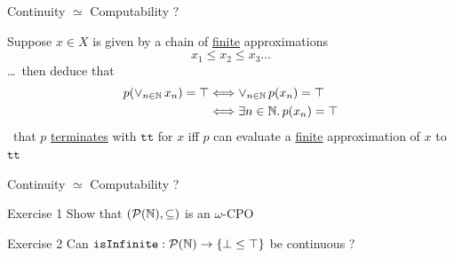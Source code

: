\documentclass{beamer}
\begin{document}
\begin{frame}{Continuity $\simeq$ Computability ?}

        \begin{center}
        \end{center}

        \vfill
        Suppose $x \in X$ is given by a chain of \alert{\underline{finite}} approximations
        \[
                x_1 \leq x_2 \leq x_3 \dots
        \]
        \dots\ then deduce that
        \begin{align*}
                p(\vee_{n \in \mathbb{N}}\, x_n) = \top & \Longleftrightarrow \vee_{n \in \mathbb{N}}\, p(x_n) = \top
                \\
                                                   & \Longleftrightarrow \exists n \in \mathbb{N}.\, p(x_n) = \top
        \end{align*}
        \pause
        \ie\ that $p$ \alert{\underline{terminates}} with $\mathtt{tt}$ for $x$
        iff $p$ can evaluate a \alert{\underline{finite}} approximation of $x$ to
        $\mathtt{tt}$
\end{frame}

\begin{frame}{ Continuity $\simeq$ Computability ?}
        
        \begin{block}{Exercise 1}
                Show that $(\mathcal{P}(\mathbb{N}), \subseteq)$ is an $\omega$-CPO
        \end{block}

        \smallskip
        \begin{block}{Exercise 2}
        Can $\mathtt{isInfinite} : \mathcal{P}(\mathbb{N}) \to \{
        \bot \leq \top \}$ be continuous ?
        \end{block}
\end{frame}
\end{document}
